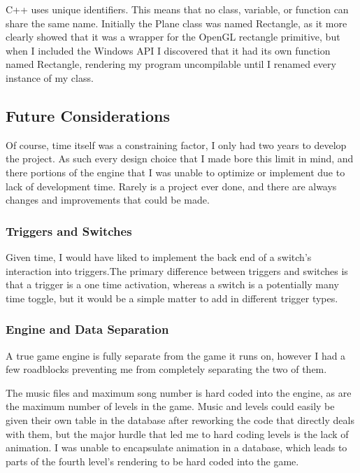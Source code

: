 \documentclass{article}
\begin{document}
C++ uses unique identifiers. This means that no class, variable, or function can share the same name. Initially the Plane class was named Rectangle, as it more clearly showed that it was a wrapper for the OpenGL rectangle primitive, but when I included the Windows API I discovered that it had its own function named Rectangle, rendering my program uncompilable until I renamed every instance of my class.

\subsection{Future Considerations} \label{subsec:future}

Of course, time itself was a constraining factor, I only had two years to develop the project. As such every design choice that I made bore this limit in mind, and there portions of the engine that I was unable to optimize or implement due to lack of development time. Rarely is a project ever done, and there are always changes and improvements that could be made.

\subsubsection{Triggers and Switches} \label{subsubsec:trigandswitch}

Given time, I would have liked to implement the back end of a switch's interaction into triggers.The primary difference between triggers and switches is that a trigger is a one time activation, whereas a switch is a potentially many time toggle, but it would be a simple matter to add in different trigger types.

\subsubsection{Engine and Data Separation} \label{subsubsec:seperation}

A true game engine is fully separate from the game it runs on, however I had a few roadblocks preventing me from completely separating the two of them.

The music files and maximum song number is hard coded into the engine, as are the maximum number of levels in the game. Music and levels could easily be given their own table in the database after reworking the code that directly deals with them, but the major hurdle that led me to hard coding levels is the lack of animation. I was unable to encapsulate animation in a database, which leads to parts of the fourth level's rendering to be hard coded into the game.
\end{document}
